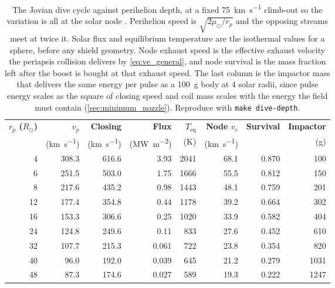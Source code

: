 \documentclass{article}
\begin{document}
\begin{table}[!htpb]
    \centering
    \caption{The Jovian dive cycle against perihelion depth, at a fixed \SI{75}{\kilo\meter\per\second} climb-out so the variation is all at the solar node \cite{Katz_aim_is_all_you_need_2025}. Perihelion speed is $\sqrt{2\mu_\odot/r_p}$ and the opposing streams meet at twice it. Solar flux and equilibrium temperature are the isothermal values for a sphere, before any shield geometry. Node exhaust speed is the effective exhaust velocity the periapsis collision delivers by \autoref{eq:ve_general}, and node survival is the mass fraction left after the boost is bought at that exhaust speed. The last column is the impactor mass that delivers the same energy per pulse as a \SI{100}{\gram} body at 4 solar radii, since pulse energy scales as the square of closing speed and coil mass scales with the energy the field must contain (\autoref{sec:minimum_nozzle}). Reproduce with \texttt{make dive-depth}.}
    \label{tab:dive_depth_dial}
    \begin{tabular}{|r|r|r|r|r|r|r|r|}\hline
        \textbf{$r_p$ ($R_\odot$)} & \textbf{$v_p$} & \textbf{Closing} & \textbf{Flux} & \textbf{$T_{\mathrm{eq}}$} & \textbf{Node $v_e$} & \textbf{Survival} & \textbf{Impactor} \\
         & (\si{\kilo\meter\per\second}) & (\si{\kilo\meter\per\second}) & (\si{\mega\watt\per\square\meter}) & (\si{\kelvin}) & (\si{\kilo\meter\per\second}) & & (\si{\gram}) \\\hline
        4 & 308.3 & 616.6 & 3.93 & 2041 & 68.1 & 0.870 & 100 \\\hline
        6 & 251.5 & 503.0 & 1.75 & 1666 & 55.5 & 0.812 & 150 \\\hline
        8 & 217.6 & 435.2 & 0.98 & 1443 & 48.1 & 0.759 & 201 \\\hline
        12 & 177.4 & 354.8 & 0.44 & 1178 & 39.2 & 0.664 & 302 \\\hline
        16 & 153.3 & 306.6 & 0.25 & 1020 & 33.9 & 0.582 & 404 \\\hline
        24 & 124.8 & 249.6 & 0.11 & 833 & 27.6 & 0.452 & 610 \\\hline
        32 & 107.7 & 215.3 & 0.061 & 722 & 23.8 & 0.354 & 820 \\\hline
        40 & 96.0 & 192.0 & 0.039 & 645 & 21.2 & 0.279 & 1031 \\\hline
        48 & 87.3 & 174.6 & 0.027 & 589 & 19.3 & 0.222 & 1247 \\\hline
    \end{tabular}
\end{table}
\end{document}
